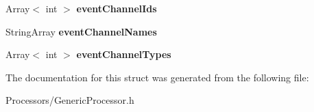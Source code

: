 \begin{DoxyCompactItemize}
\item 
\hypertarget{structGenericProcessor_1_1ProcessorSettings_a17416831390807a264da580946106eb0}{Array$<$ int $>$ {\bfseries event\-Channel\-Ids}}\label{structGenericProcessor_1_1ProcessorSettings_a17416831390807a264da580946106eb0}

\item 
\hypertarget{structGenericProcessor_1_1ProcessorSettings_a674f507298219773baa69e479ed79db3}{String\-Array {\bfseries event\-Channel\-Names}}\label{structGenericProcessor_1_1ProcessorSettings_a674f507298219773baa69e479ed79db3}

\item 
\hypertarget{structGenericProcessor_1_1ProcessorSettings_a4bd13b2961e673d5765e6cd4671a2866}{Array$<$ int $>$ {\bfseries event\-Channel\-Types}}\label{structGenericProcessor_1_1ProcessorSettings_a4bd13b2961e673d5765e6cd4671a2866}

\end{DoxyCompactItemize}


The documentation for this struct was generated from the following file\-:\begin{DoxyCompactItemize}
\item 
Processors/Generic\-Processor.\-h\end{DoxyCompactItemize}
